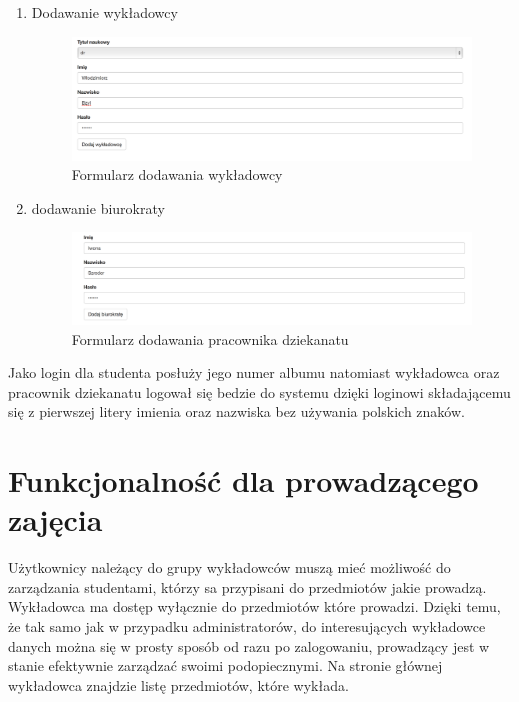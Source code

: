\documentclass[brudnopis]{xmgr}
\begin{document}
\begin{itemize}
\begin{enumerate}
\item Dodawanie wykładowcy

\begin{figure}[th!]
\centering
\includegraphics[width=1.1\hsize]{images/addTeacher} 
\caption{Formularz dodawania wykładowcy\label{RYS.8}}
\end{figure}
\newpage
\item dodawanie biurokraty

\begin{figure}[th!]
\centering
\includegraphics[width=0.7\hsize]{images/addBiurokrata} 
\caption{Formularz dodawania pracownika dziekanatu\label{RYS.9}}
\end{figure}

\end{enumerate}
\end{itemize}

Jako login dla studenta posłuży jego numer albumu natomiast wykładowca oraz pracownik dziekanatu logował się bedzie do systemu  dzięki loginowi składającemu się z pierwszej litery imienia oraz nazwiska bez używania polskich znaków.

\section{Funkcjonalność dla prowadzącego zajęcia}

Użytkownicy należący do grupy wykładowców muszą mieć możliwość do zarządzania studentami, którzy sa przypisani do przedmiotów jakie prowadzą. Wykładowca ma dostęp wyłącznie do przedmiotów które prowadzi. Dzięki temu, że tak samo jak w przypadku administratorów, do interesujących wykładowce danych można się w prosty sposób od razu po zalogowaniu, prowadzący jest w stanie efektywnie zarządzać swoimi podopiecznymi. Na stronie głównej wykładowca znajdzie listę przedmiotów, które wykłada.
\end{document}
